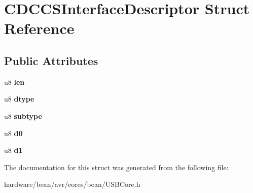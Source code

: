\hypertarget{struct_c_d_c_c_s_interface_descriptor}{}\section{C\+D\+C\+C\+S\+Interface\+Descriptor Struct Reference}
\label{struct_c_d_c_c_s_interface_descriptor}
\subsection*{Public Attributes}
\begin{DoxyCompactItemize}
\item 
\hypertarget{struct_c_d_c_c_s_interface_descriptor_a4898e456596cc2351587e6f8313f0135}{}u8 {\bfseries len}\label{struct_c_d_c_c_s_interface_descriptor_a4898e456596cc2351587e6f8313f0135}

\item 
\hypertarget{struct_c_d_c_c_s_interface_descriptor_a40eb77b74991465abcdbf3cfda5cb4fc}{}u8 {\bfseries dtype}\label{struct_c_d_c_c_s_interface_descriptor_a40eb77b74991465abcdbf3cfda5cb4fc}

\item 
\hypertarget{struct_c_d_c_c_s_interface_descriptor_a9ba536afa860b01eff6b0da6f31a5445}{}u8 {\bfseries subtype}\label{struct_c_d_c_c_s_interface_descriptor_a9ba536afa860b01eff6b0da6f31a5445}

\item 
\hypertarget{struct_c_d_c_c_s_interface_descriptor_a8354e45c15df0e06cc72b35d6cea23f5}{}u8 {\bfseries d0}\label{struct_c_d_c_c_s_interface_descriptor_a8354e45c15df0e06cc72b35d6cea23f5}

\item 
\hypertarget{struct_c_d_c_c_s_interface_descriptor_a1c4fa9ab196fe4731d541f8abcefa36a}{}u8 {\bfseries d1}\label{struct_c_d_c_c_s_interface_descriptor_a1c4fa9ab196fe4731d541f8abcefa36a}

\end{DoxyCompactItemize}


The documentation for this struct was generated from the following file\+:\begin{DoxyCompactItemize}
\item 
hardware/bean/avr/cores/bean/U\+S\+B\+Core.\+h\end{DoxyCompactItemize}
